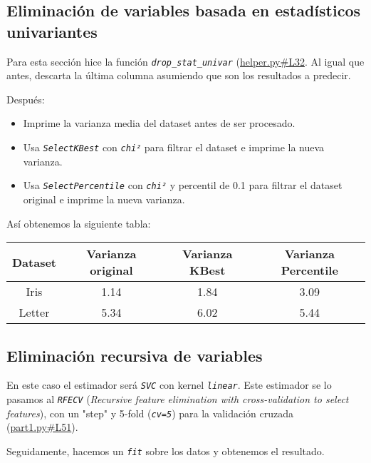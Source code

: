 \documentclass[
12pt, 
spanish, 
singlespacing,
headsepline
]{article}
\begin{document}
\subsection{Eliminación de variables basada en estadísticos univariantes}
Para esta sección hice la función \texttt{\textit{drop_stat_univar}} (\href{https://github.com/uo272509/InteligenciaNegocioPL/blob/7f59f8fb2b83986595ab9083fa9a6d28ed39c67c/Prac2/helper.py\#L32}{helper.py\#L32}. Al igual que antes, descarta la última columna asumiendo que son los resultados a predecir.

Después:
\begin{itemize}
\item Imprime la varianza media del dataset antes de ser procesado.
\item Usa \texttt{\textit{SelectKBest}} con \texttt{\textit{chi²}} para filtrar el dataset e imprime la nueva varianza.
\item Usa \texttt{\textit{SelectPercentile}} con \texttt{\textit{chi²}} y percentil de 0.1 para filtrar el dataset original e imprime la nueva varianza.
\end{itemize}

Así obtenemos la siguiente tabla:

\begin{center}
\begin{tabular}{|c|c|c|c|}
\hline 
Dataset & Varianza original & Varianza KBest & Varianza Percentile\\ 
\hline 
Iris & 1.14 & 1.84 & 3.09\\ 
\hline
Letter & 5.34 & 6.02 & 5.44 \\ 
\hline 
\end{tabular}
\end{center}

\subsection{Eliminación recursiva de variables}
En este caso el estimador será \texttt{\textit{SVC}} con kernel \texttt{\textit{linear}}. Este estimador se lo pasamos al \texttt{\textit{RFECV}} (\textit{Recursive feature elimination with cross-validation to select features}), con un "step" y 5-fold (\texttt{\textit{cv=5}}) para la validación cruzada (\href{https://github.com/uo272509/InteligenciaNegocioPL/blob/7f59f8fb2b83986595ab9083fa9a6d28ed39c67c/Prac2/part1.py\#L51}{part1.py\#L51}).

Seguidamente, hacemos un \texttt{\textit{fit}} sobre los datos y obtenemos el resultado.
\end{document}
